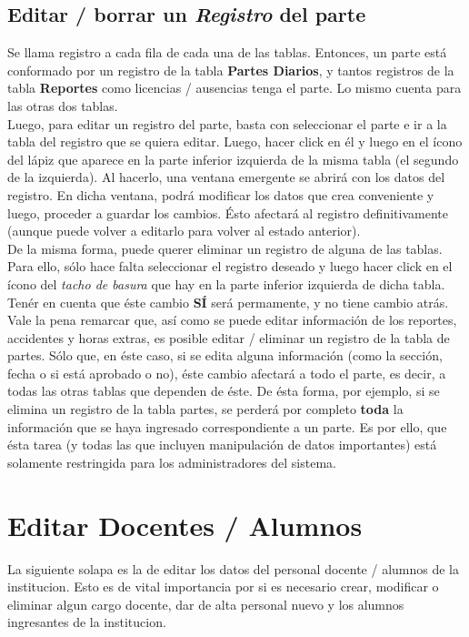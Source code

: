 \documentclass[12pt,a4paper]{article}
\begin{document}
\subsection{Editar / borrar un \textit{Registro} del parte}
Se llama registro a cada fila de cada una de las tablas. Entonces, un parte está conformado por un registro de la tabla \textbf{Partes Diarios}, y tantos registros de la tabla \textbf{Reportes} como licencias / ausencias tenga el parte. Lo mismo cuenta para las otras dos tablas.\\
Luego, para editar un registro del parte, basta con seleccionar el parte e ir a la tabla del registro que se quiera editar. Luego, hacer click en él y luego en el ícono del lápiz que aparece en la parte inferior izquierda de la misma tabla (el segundo de la izquierda). Al hacerlo, una ventana emergente se abrirá con los datos del registro. En dicha ventana, podrá modificar los datos que crea conveniente y luego, proceder a guardar los cambios. Ésto afectará al registro definitivamente (aunque puede volver a editarlo para volver al estado anterior). \\
De la misma forma, puede querer eliminar un registro de alguna de las tablas. Para ello, sólo hace falta seleccionar el registro deseado y luego hacer click en el ícono del \textit{tacho de basura} que hay en la parte inferior izquierda de dicha tabla. Tenér en cuenta que éste cambio \textbf{SÍ} será permamente, y no tiene cambio atrás. \\
Vale la pena remarcar que, así como se puede editar información de los reportes, accidentes y horas extras, es posible editar / eliminar un registro de la tabla de partes. Sólo que, en éste caso, si se edita alguna información (como la sección, fecha o si está aprobado o no), éste cambio afectará a todo el parte, es decir, a todas las otras tablas que dependen de éste. De ésta forma, por ejemplo, si se elimina un registro de la tabla partes, se perderá por completo \textbf{toda} la información que se haya ingresado correspondiente a un parte. Es por ello, que ésta tarea (y todas las que incluyen manipulación de datos importantes) está solamente restringida para los administradores del sistema.

\section{Editar Docentes / Alumnos}

La siguiente solapa es la de editar los datos del personal docente / alumnos de la institucion. Esto es de vital importancia por si es necesario crear, modificar o eliminar algun cargo docente, dar de alta personal nuevo y los alumnos ingresantes de la institucion.
\end{document}
